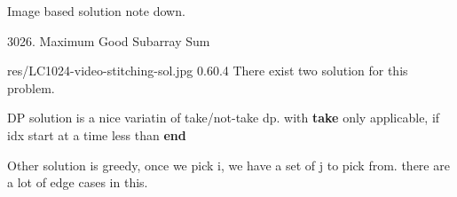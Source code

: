 
Image based solution note down.

\begin{problem}{3026. Maximum Good Subarray Sum}
    
    
    \end{problem}
\begin{solution}[greedy,dp]
        

    \begin{lfigure}{res/LC1024-video-stitching-sol.jpg}
        {0.6}{0.4} 
        There exist two solution for this problem.

        DP solution is a nice variatin of take/not-take dp. with \textbf{take} only applicable, if idx start at a time less than \textbf{end}

        Other solution is greedy, once we pick i, we have a set of j to pick from.
        there are a lot of edge cases in this.
    \end{lfigure}
\end{solution}
